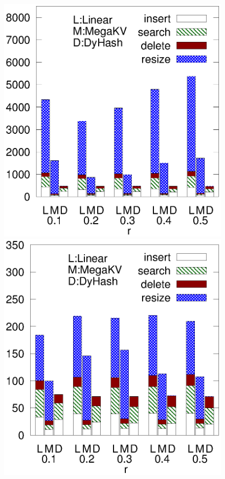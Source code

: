 \begin{figure}[h]
\begin{minipage}{0.18\linewidth}
		\centerline{\dsreddit}
	\end{minipage}
	\hfill
	\begin{minipage}{0.18\linewidth}\centering
		\includegraphics[width=\linewidth]{pic/dynamic/tpch/diff_r.eps}
		\centerline{\dstpch}
	\end{minipage}
	\hfill
	\begin{minipage}{0.18\linewidth}\centering
		\includegraphics[width=\linewidth]{pic/dynamic/ali/diff_r.eps}

\end{minipage}
\end{figure}
